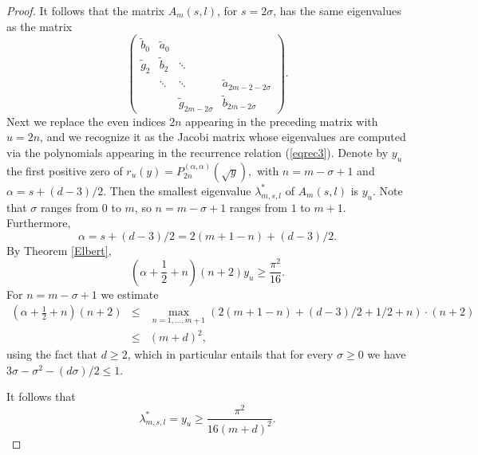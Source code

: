 \documentclass[12pt]{amsart}
\begin{document}
\begin{proof}
It follows that the matrix $A_{m}\left( s,l\right) $, for $s=2\sigma $, has the
same eigenvalues as the matrix
\begin{equation*}
\left( 
\begin{array}{cccc}
\widetilde{b}_{0} & \widetilde{a}_{0} &  &  \\ 
\widetilde{g}_{2} & \widetilde{b}_{2} & \ddots  &  \\ 
& \ddots  & \ddots  & \widetilde{a}_{2m- 2 - 2\sigma } \\ 
&  & \widetilde{g}_{2m-2\sigma } & \widetilde{b}_{2m-2\sigma }
\end{array}
\right). 
\end{equation*}%
Next we replace the even indices $2n$ appearing
in the preceding matrix with $u = 2n$, 
and we recognize it as the Jacobi matrix
whose eigenvalues are computed via the polynomials appearing in the recurrence relation (\ref{eqrec3}). 
Denote  by  $y_u$ the first positive zero  of $r_u (y) =
P_{2n}^{\left( \alpha ,\alpha \right) } \left( \sqrt{y}\right),$ 
with $n =  m-\sigma +1$ and $\alpha
=s+\left( d-3\right) /2.$  Then  the smallest eigenvalue $\lambda _{m, s,l}^{\ast }$  of $
A_{m}\left( s,l\right) $ is $y_u$.  
Note that $\sigma $ ranges from $
0$ to $m$, so $n =m-\sigma +1$ ranges from $1$ to $m+1.$ Furthermore,  
\begin{equation*}
\alpha =s+\left( d-3\right) /2=2\left( m+1-n\right) +\left( d-3\right) /2.
\end{equation*}
By Theorem \ref{Elbert},
\begin{equation*}
\left( \alpha +\frac{1}{2}+n\right) \left( n+2\right) y_u\geq \frac{\pi ^{2}}{16}.
\end{equation*}
For $n=m-\sigma +1$ we estimate     
\begin{eqnarray*}
\left( \alpha +\frac{1}{2}+n \right) \left( n+2\right)  &\leq
&\max_{n=1,\dots , m+1}\left( 2\left( m+1-n\right) +\left( d-3\right) /2 + 1/2 +    n \right)
\cdot \left( n+2\right)  \\
&\leq & \left( m + d \right)^{2},
\end{eqnarray*}
using the fact that $d \ge 2$, which in particular entails that for every $\sigma \ge 0$ we have $3 \sigma - \sigma^2 - (d \sigma)/2 \le 1$. 

It follows that  
\begin{equation*}
\lambda _{m, s,l}^{\ast } 
=
 y_{u} 
\geq 
\frac{\pi ^{2}}{16\left( m+ d\right)^{2}}.
\end{equation*}
\end{proof}
\end{document}
